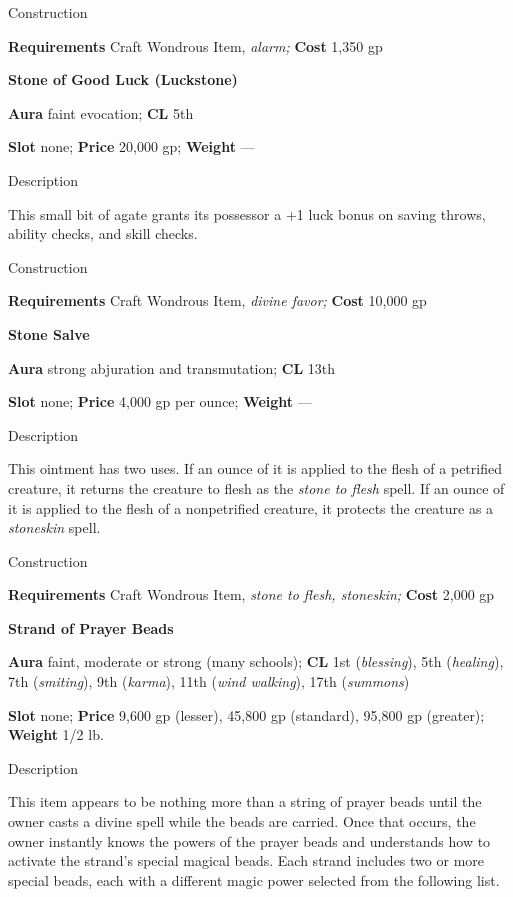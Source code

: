 Construction
				
\textbf{Requirements} Craft Wondrous Item,\textit{ alarm;}\textbf{ Cost }1,350 gp
				
\textbf{Stone of Good Luck (Luckstone)}
				
\textbf{Aura} faint evocation;\textbf{ CL }5th
				
\textbf{Slot} none; \textbf{Price} 20,000 gp; \textbf{Weight }---
				
Description
				
This small bit of agate grants its possessor a +1 luck bonus on saving throws, ability checks, and skill checks. 
				
Construction
				
\textbf{Requirements} Craft Wondrous Item,\textit{ divine favor;}\textbf{ Cost }10,000 gp
				
\textbf{Stone Salve}
				
\textbf{Aura} strong abjuration and transmutation;\textbf{ CL }13th
				
\textbf{Slot} none; \textbf{Price} 4,000 gp per ounce; \textbf{Weight }---
				
Description
				
This ointment has two uses. If an ounce of it is applied to the flesh of a petrified creature, it returns the creature to flesh as the \textit{stone to flesh} spell. If an ounce of it is applied to the flesh of a nonpetrified creature, it protects the creature as a \textit{stoneskin} spell. 
				
Construction
				
\textbf{Requirements} Craft Wondrous Item,\textit{ stone to flesh, stoneskin;}\textbf{ Cost }2,000 gp
				
\textbf{Strand of Prayer Beads}
				
\textbf{Aura} faint, moderate or strong (many schools);\textbf{ CL }1st (\textit{blessing}), 5th (\textit{healing}), 7th (\textit{smiting}), 9th (\textit{karma}), 11th (\textit{wind walking}), 17th (\textit{summons})
				
\textbf{Slot} none; \textbf{Price} 9,600 gp (lesser), 45,800 gp (standard), 95,800 gp (greater); \textbf{Weight }1/2 lb.
				
Description
				
This item appears to be nothing more than a string of prayer beads until the owner casts a divine spell while the beads are carried. Once that occurs, the owner instantly knows the powers of the prayer beads and understands how to activate the strand's special magical beads. Each strand includes two or more special beads, each with a different magic power selected from the following list.

